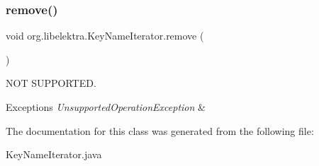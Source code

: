 \subsubsection{\texorpdfstring{remove()}{remove()}}
{\footnotesize\ttfamily void org.\+libelektra.\+Key\+Name\+Iterator.\+remove (\begin{DoxyParamCaption}{ }\end{DoxyParamCaption})\hspace{0.3cm}{\ttfamily [inline]}}



N\+OT S\+U\+P\+P\+O\+R\+T\+ED. 


\begin{DoxyExceptions}{Exceptions}
{\em Unsupported\+Operation\+Exception} & \\
\hline
\end{DoxyExceptions}


The documentation for this class was generated from the following file\+:\begin{DoxyCompactItemize}
\item 
Key\+Name\+Iterator.\+java\end{DoxyCompactItemize}
